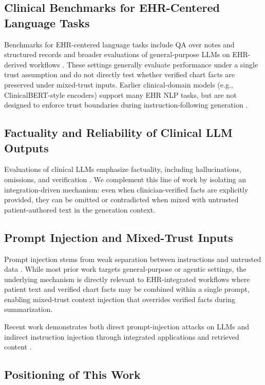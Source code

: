 \documentclass{article}
\theoremstyle{plain}
\theoremstyle{definition}
\theoremstyle{remark}
\begin{document}
\subsection{Clinical Benchmarks for EHR-Centered Language Tasks}

Benchmarks for EHR-centered language tasks include QA over notes and structured records \citep{pampari2018emrqa,kweon2024ehrnoteqa} and broader evaluations of general-purpose LLMs on EHR-derived workflows \citep{liu2025medhelm}. These settings generally evaluate performance under a single trust assumption and do not directly test whether verified chart facts are preserved under mixed-trust inputs. Earlier clinical-domain models (e.g., ClinicalBERT-style encoders) support many EHR NLP tasks, but are not designed to enforce trust boundaries during instruction-following generation \citep{alsentzer2019publicly}.

\subsection{Factuality and Reliability of Clinical LLM Outputs}

Evaluations of clinical LLMs emphasize factuality, including hallucinations, omissions, and verification \citep{chung2025nejmai}. We complement this line of work by isolating an integration-driven mechanism: even when clinician-verified facts are explicitly provided, they can be omitted or contradicted when mixed with untrusted patient-authored text in the generation context.

\subsection{Prompt Injection and Mixed-Trust Inputs}

Prompt injection stems from weak separation between instructions and untrusted data \citep{owasp_prompt_injection}. While most prior work targets general-purpose or agentic settings, the underlying mechanism is directly relevant to EHR-integrated workflows where patient text and verified chart facts may be combined within a single prompt, enabling mixed-trust context injection that overrides verified facts during summarization.

Recent work demonstrates both direct prompt-injection attacks on LLMs and indirect instruction injection through integrated applications and retrieved content \citep{greshake2023not,bagdasaryan2023multimodal}.

\subsection{Positioning of This Work}
\end{document}

